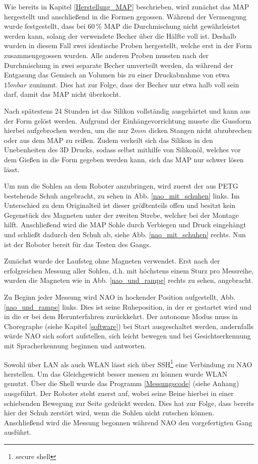 Wie bereits in Kapitel \ref{Herstellung_MAP} beschrieben, wird zunächst das MAP hergestellt und anschließend in die Formen gegossen. Während der Vermengung wurde festgestellt, dass bei 60\,\% MAP die Durchmischung nicht gewährleistet werden kann, solang der verwendete Becher über die Hälfte voll ist. Deshalb wurden in diesem Fall zwei identische Proben hergestellt, welche erst in der Form zusammengegossen wurden. Alle anderen Proben mussten nach der Durchmischung in zwei separate Becher umverteilt werden, da während der Entgasung das Gemisch an Volumen bis zu einer Druckabnahme von etwa $15 \unit{mbar}$ zunimmt. Dies hat zur Folge, dass der Becher nur etwa halb voll sein darf, damit das MAP nicht \glqq überkocht\grqq{}. 

Nach spätestens 24 Stunden ist das Silikon vollständig ausgehärtet und kann aus der Form gelöst werden. Aufgrund der Einhängevorrichtung musste die Gussform hierbei aufgebrochen werden, um die nur $2 \unit{mm}$ dicken Stangen nicht abzubrechen oder aus dem MAP zu reißen. Zudem verkeilt sich das Silikon in den Unebenheiten des 3D Drucks, sodass selbst mithilfe von Silikonöl, welches vor dem Gießen in die Form gegeben werden kann, sich das MAP nur schwer lösen lässt. 

Um nun die Sohlen an dem Roboter anzubringen, wird zuerst der aus PETG bestehende Schuh angebracht, zu sehen in Abb. \ref{nao_mit_schuhen} links. Im Unterschied zu dem Originalteil ist dieser größtenteils offen und besitzt kein Gegenstück des Magneten unter der zweiten Strebe, welcher bei der Montage hilft. Anschließend wird die MAP Sohle durch Verbiegen und Druck eingehängt und schließt dadurch den Schuh ab, siehe Abb. \ref{nao_mit_schuhen} rechts. Nun ist der Roboter bereit für das Testen des Gangs.

Zunächst wurde der Laufsteg ohne Magneten verwendet. Erst nach der erfolgreichen Messung aller Sohlen, d.h. mit höchstens einem Sturz pro Messreihe, wurden die Magneten wie in Abb. \ref{nao_und_rampe} rechts zu sehen, angebracht. 

Zu Beginn jeder Messung wird NAO in hockender Position aufgestellt, Abb. \ref{nao_und_rampe} links. Dies ist seine Ruheposition, in der er gestartet wird und in die er bei dem Herunterfahren zurückkehrt. Der autonome Modus muss in Choregraphe (siehe Kapitel \ref{software}) bei Start ausgeschaltet werden, andernfalls würde NAO sich sofort aufstellen, sich leicht bewegen und bei Gesichtserkennung mit Spracherkennung beginnen und antworten. 

Sowohl über LAN als auch WLAN lässt sich über SSH\footnote{secure shell} eine Verbindung zu NAO herstellen. Um das Gleichgewicht besser messen zu können wurde WLAN genutzt. Über die Shell wurde das Programm \ref{Messungscode} (siehe Anhang) ausgeführt. Der Roboter steht zuerst auf, wobei seine Beine hierbei in einer schiebenden Bewegung zur Seite gedrückt werden. Dies hat zur Folge, dass bereits hier der Schuh zerstört wird, wenn die Sohlen nicht rutschen können. Anschließend wird die Messung begonnen während NAO den vorgefertigten Gang ausführt. 

